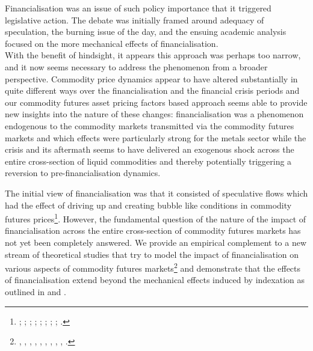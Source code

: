 \documentclass[
  authoryear,
  preprint,
  3p]{elsarticle}
\begin{document}
\bigskip
\bigskip

Financialisation was an issue of such policy importance that it
triggered legislative action. The debate was initially framed around
adequacy of speculation, the burning issue of the day, and the ensuing
academic analysis focused on the more mechanical effects of
financialisation.\\
With the benefit of hindsight, it appears this approach was perhaps too
narrow, and it now seems necessary to address the phenomenon from a
broader perspective. Commodity price dynamics appear to have altered
substantially in quite different ways over the financialisation and the
financial crisis periods and our commodity futures asset pricing factors
based approach seems able to provide new insights into the nature of
these changes: financialisation was a phenomenon endogenous to the
commodity markets transmitted via the commodity futures markets and
which effects were particularly strong for the metals sector while the
crisis and its aftermath seems to have delivered an exogenous shock
across the entire cross-section of liquid commodities and thereby
potentially triggering a reversion to pre-financialisation dynamics.

The initial view of financialisation was that it consisted of
speculative flows which had the effect of driving up and creating bubble
like conditions in commodity futures prices\footnote{\citet{masters_testimony_2008};
  \citet{masters_accidental_2008}; \citet{unctad_global_2009};
  \citet{deschutter_food_2010}; \citet{gilbert_how_2010};
  \citet{gilbert_speculative_2010}; \citet{herman_not_2011};
  \citet{schumann_hunger_2011}; \citet{singleton_investor_2013}.}.
However, the fundamental question of the nature of the impact of
financialisation across the entire cross-section of commodity futures
markets has not yet been completely answered. We provide an empirical
complement to a new stream of theoretical studies that try to model the
impact of financialisation on various aspects of commodity futures
markets\footnote{\citet{etula_broker-dealer_2013},
  \citet{acharya_limits_2013}, \citet{cheng_convective_2014},
  \citet{leclercq_equilibrium_2014}, \citet{sockin_informational_2015},
  \citet{goldstein_speculation_2014}, \citet{ekeland_speculation_2016},
  \citet{goldstein_commodity_2022}, \citet{ekeland_hedging_2019},
  \citet{isleimeyyeh_role_2020}.} and demonstrate that the effects of
financialisation extend beyond the mechanical effects induced by
indexation as outlined in \citet{tang_index_2012} and
\citet{basak_model_2016}.
\end{document}
